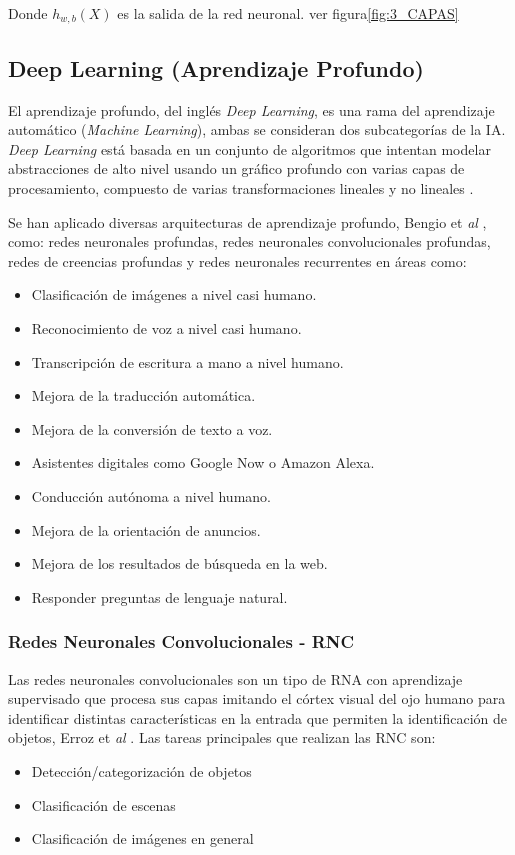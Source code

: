 Donde $h_{w,b}(X)$ es la salida de la red neuronal. ver figura\ref{fig:3_CAPAS}

\subsection{Deep Learning (Aprendizaje Profundo)}

El aprendizaje profundo, del inglés \textit{Deep Learning}, es una rama del aprendizaje automático (\textit{Machine Learning}), ambas se consideran dos subcategorías de la IA. \textit{Deep Learning} está basada en un conjunto de algoritmos que intentan modelar abstracciones de alto nivel usando un gráfico profundo con varias capas de procesamiento, compuesto de varias transformaciones lineales y no lineales \cite{bengio2017deep}.

Se han aplicado diversas arquitecturas de aprendizaje profundo, Bengio et \textit{al} \cite{bengio2009learning}, como: redes neuronales profundas, redes neuronales convolucionales profundas, redes de creencias profundas y redes neuronales recurrentes en áreas como:
\begin{itemize}
    \item Clasificación de imágenes a nivel casi humano.
    \item Reconocimiento de voz a nivel casi humano.
    \item Transcripción de escritura a mano a nivel humano.
    \item Mejora de la traducción automática.
    \item Mejora de la conversión de texto a voz.
    \item Asistentes digitales como Google Now o Amazon Alexa.
    \item Conducción autónoma a nivel humano.
    \item Mejora de la orientación de anuncios.
    \item Mejora de los resultados de búsqueda en la web.
    \item Responder preguntas de lenguaje natural.
\end{itemize}

\subsubsection{Redes Neuronales Convolucionales - RNC} \label{sec:RNC}

Las redes neuronales convolucionales son un tipo de RNA con aprendizaje supervisado que procesa sus capas imitando el córtex visual del ojo humano para identificar distintas características en la entrada que permiten la identificación de objetos, Erroz et \textit{al} \cite{erroz2019visualizando}. Las tareas principales que realizan las RNC son:
\begin{itemize}
    \item Detección/categorización de objetos
    \item Clasificación de escenas
    \item Clasificación de imágenes en general
\end{itemize}

